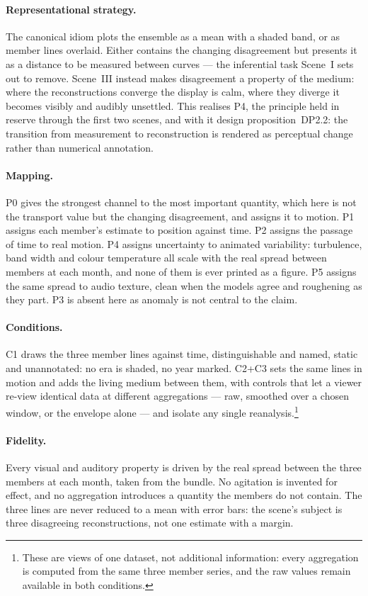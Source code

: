 \paragraph{Representational strategy.} The canonical idiom plots the ensemble as a mean with a shaded band, or as member lines overlaid. Either contains the changing disagreement but presents it as a distance to be measured between curves --- the inferential task Scene~I sets out to remove. Scene~III instead makes disagreement a property of the medium: where the reconstructions converge the display is calm, where they diverge it becomes visibly and audibly unsettled. This realises P4, the principle held in reserve through the first two scenes, and with it design proposition~DP2.2: the transition from measurement to reconstruction is rendered as perceptual change rather than numerical annotation.
 
\paragraph{Mapping.} P0 gives the strongest channel to the most important quantity, which here is not the transport value but the changing disagreement, and assigns it to motion. P1 assigns each member's estimate to position against time. P2 assigns the passage of time to real motion. P4 assigns uncertainty to animated variability: turbulence, band width and colour temperature all scale with the real spread between members at each month, and none of them is ever printed as a figure. P5 assigns the same spread to audio texture, clean when the models agree and roughening as they part. P3 is absent here as anomaly is not central to the claim.
 
\paragraph{Conditions.} C1 draws the three member lines against time, distinguishable and named, static and unannotated: no era is shaded, no year marked. C2+C3 sets the same lines in motion and adds the living medium between them, with controls that let a viewer re-view identical data at different aggregations --- raw, smoothed over a chosen window, or the envelope alone --- and isolate any single reanalysis.\footnote{These are views of one dataset, not additional information: every aggregation is computed from the same three member series, and the raw values remain available in both conditions.}
 
\paragraph{Fidelity.} Every visual and auditory property is driven by the real spread between the three members at each month, taken from the bundle. No agitation is invented for effect, and no aggregation introduces a quantity the members do not contain. The three lines are never reduced to a mean with error bars: the scene's subject is three disagreeing reconstructions, not one estimate with a margin.

